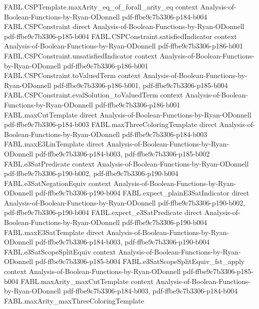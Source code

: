 \begin{theorem}
\proofstep
  {FABL.CSPTemplate.maxArity_eq_of_forall_arity_eq}
  {context}
  {Analysis-of-Boolean-Functions-by-Ryan-ODonnell}
  {pdf-ffbe9c7b3306-p184-b004}
\proofstep
  {FABL.CSPConstraint}
  {direct}
  {Analysis-of-Boolean-Functions-by-Ryan-ODonnell}
  {pdf-ffbe9c7b3306-p185-b004}
\proofstep
  {FABL.CSPConstraint.satisfiedIndicator}
  {context}
  {Analysis-of-Boolean-Functions-by-Ryan-ODonnell}
  {pdf-ffbe9c7b3306-p186-b001}
\proofstep
  {FABL.CSPConstraint.unsatisfiedIndicator}
  {context}
  {Analysis-of-Boolean-Functions-by-Ryan-ODonnell}
  {pdf-ffbe9c7b3306-p186-b001}
\proofstep
  {FABL.CSPConstraint.toValuedTerm}
  {context}
  {Analysis-of-Boolean-Functions-by-Ryan-ODonnell}
  {pdf-ffbe9c7b3306-p186-b001,
    pdf-ffbe9c7b3306-p185-b004}
\proofstep
  {FABL.CSPConstraint.evalSolution_toValuedTerm}
  {context}
  {Analysis-of-Boolean-Functions-by-Ryan-ODonnell}
  {pdf-ffbe9c7b3306-p186-b001}
\proofstep
  {FABL.maxCutTemplate}
  {direct}
  {Analysis-of-Boolean-Functions-by-Ryan-ODonnell}
  {pdf-ffbe9c7b3306-p184-b003}
\proofstep
  {FABL.maxThreeColoringTemplate}
  {direct}
  {Analysis-of-Boolean-Functions-by-Ryan-ODonnell}
  {pdf-ffbe9c7b3306-p184-b003}
\proofstep
  {FABL.maxE3LinTemplate}
  {direct}
  {Analysis-of-Boolean-Functions-by-Ryan-ODonnell}
  {pdf-ffbe9c7b3306-p184-b003,
    pdf-ffbe9c7b3306-p185-b002}
\proofstep
  {FABL.e3SatPredicate}
  {context}
  {Analysis-of-Boolean-Functions-by-Ryan-ODonnell}
  {pdf-ffbe9c7b3306-p190-b002,
    pdf-ffbe9c7b3306-p190-b004}
\proofstep
  {FABL.e3SatNegationEquiv}
  {context}
  {Analysis-of-Boolean-Functions-by-Ryan-ODonnell}
  {pdf-ffbe9c7b3306-p190-b004}
\proofstep
  {FABL.expect_plainE3SatIndicator}
  {direct}
  {Analysis-of-Boolean-Functions-by-Ryan-ODonnell}
  {pdf-ffbe9c7b3306-p190-b002,
    pdf-ffbe9c7b3306-p190-b004}
\proofstep
  {FABL.expect_e3SatPredicate}
  {direct}
  {Analysis-of-Boolean-Functions-by-Ryan-ODonnell}
  {pdf-ffbe9c7b3306-p190-b004}
\proofstep
  {FABL.maxE3SatTemplate}
  {direct}
  {Analysis-of-Boolean-Functions-by-Ryan-ODonnell}
  {pdf-ffbe9c7b3306-p184-b003,
    pdf-ffbe9c7b3306-p190-b004}
\proofstep
  {FABL.e3SatScopeSplitEquiv}
  {context}
  {Analysis-of-Boolean-Functions-by-Ryan-ODonnell}
  {pdf-ffbe9c7b3306-p185-b004}
\proofstep
  {FABL.e3SatScopeSplitEquiv_fst_apply}
  {context}
  {Analysis-of-Boolean-Functions-by-Ryan-ODonnell}
  {pdf-ffbe9c7b3306-p185-b004}
\proofstep
  {FABL.maxArity_maxCutTemplate}
  {context}
  {Analysis-of-Boolean-Functions-by-Ryan-ODonnell}
  {pdf-ffbe9c7b3306-p184-b003,
    pdf-ffbe9c7b3306-p184-b004}
\proofstep
  {FABL.maxArity_maxThreeColoringTemplate}

\end{theorem}
